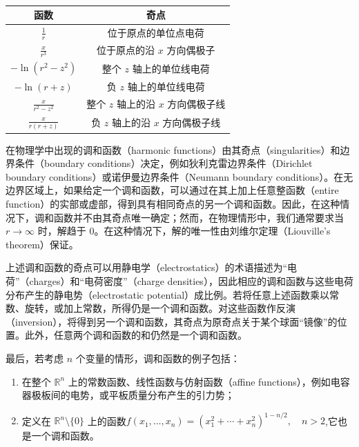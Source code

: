 \begin{table}[ht]
\centering
\caption{}\label{tab_THhs1}
\begin{tabular}{|c|c|}
\hline
\textbf{函数}&\textbf{奇点}\\
\hline
\(\displaystyle \frac{1}{r}\)& 位于原点的单位点电荷 \\
\hline
\(\displaystyle \frac{x}{r^{3}}\)& 位于原点的沿 \(x\) 方向偶极子 \\
\hline
\(\displaystyle -\ln\!\left(r^{2}-z^{2}\right)\) & 整个 \(z\) 轴上的单位线电荷 \\
\hline
\(\displaystyle -\ln(r+z)\) & 负 \(z\) 轴上的单位线电荷 \\
\hline
\(\displaystyle \frac{x}{r^{2}-z^{2}}\) & 整个 \(z\) 轴上的沿 \(x\) 方向偶极子线 \\
\hline
\(\displaystyle \frac{x}{r(r+z)}\) & 负 \(z\) 轴上的沿 \(x\) 方向偶极子线 \\
\hline
\end{tabular}
\end{table}
在物理学中出现的调和函数（harmonic functions）由其奇点（singularities）和边界条件（boundary conditions）决定，例如狄利克雷边界条件（Dirichlet boundary conditions）或诺伊曼边界条件（Neumann boundary conditions）。在无边界区域上，如果给定一个调和函数，可以通过在其上加上任意整函数（entire function）的实部或虚部，得到具有相同奇点的另一个调和函数。因此，在这种情况下，调和函数并不由其奇点唯一确定；然而，在物理情形中，我们通常要求当\( r \to \infty \) 时，解趋于 \(0\)。在这种情况下，解的唯一性由刘维尔定理（Liouville's theorem）保证。

上述调和函数的奇点可以用静电学（electrostatics）的术语描述为“电荷”（charges）和“电荷密度”（charge densities），因此相应的调和函数与这些电荷分布产生的静电势（electrostatic potential）成比例。若将任意上述函数乘以常数、旋转，或加上常数，所得仍是一个调和函数。对这些函数作反演（inversion），将得到另一个调和函数，其奇点为原奇点关于某个球面“镜像”的位置。此外，任意两个调和函数的和仍然是一个调和函数。

最后，若考虑 \(n\) 个变量的情形，调和函数的例子包括：
\begin{enumerate}
\item 在整个 \(\mathbb{R}^{n}\) 上的常数函数、线性函数与仿射函数（affine functions），例如电容器极板间的电势，或平板质量分布产生的引力势；
\item 定义在 \(\mathbb{R}^{n}\setminus\{0\}\) 上的函数$f(x_{1}, \dots, x_{n}) = \left(x_{1}^{2} + \cdots + x_{n}^{2}\right)^{1 - n/2}, \quad n > 2$,它也是一个调和函数。
\end{enumerate}
